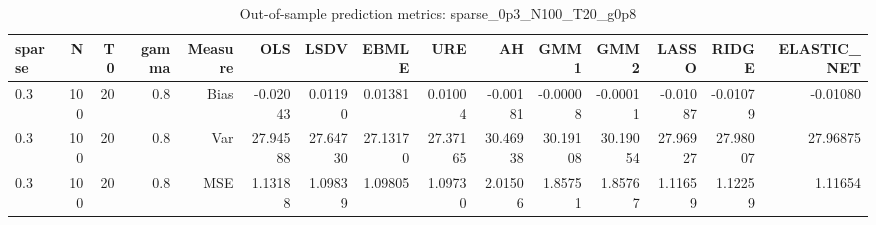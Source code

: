 \begin{table}[!htbp]\centering
\caption{Out-of-sample prediction metrics: sparse_0p3_N100_T20_g0p8}
\label{tab:table3_sparse_0p3_N100_T20_g0p8}
\begin{tabular}{lrrrrrrrrrrrrrr}
\hline
sparse & N & T0 & gamma & Measure & OLS & LSDV & EBMLE & URE & AH & GMM1 & GMM2 & LASSO & RIDGE & ELASTIC_NET \\
\hline
0.3 & 100 & 20 & 0.8 & Bias & -0.02043 & 0.01190 & 0.01381 & 0.01004 & -0.00181 & -0.00008 & -0.00011 & -0.01087 & -0.01079 & -0.01080 \\
0.3 & 100 & 20 & 0.8 & Var & 27.94588 & 27.64730 & 27.13170 & 27.37165 & 30.46938 & 30.19108 & 30.19054 & 27.96927 & 27.98007 & 27.96875 \\
0.3 & 100 & 20 & 0.8 & MSE & 1.13188 & 1.09839 & 1.09805 & 1.09730 & 2.01506 & 1.85751 & 1.85767 & 1.11659 & 1.12259 & 1.11654 \\
\hline
\end{tabular}
\end{table}

